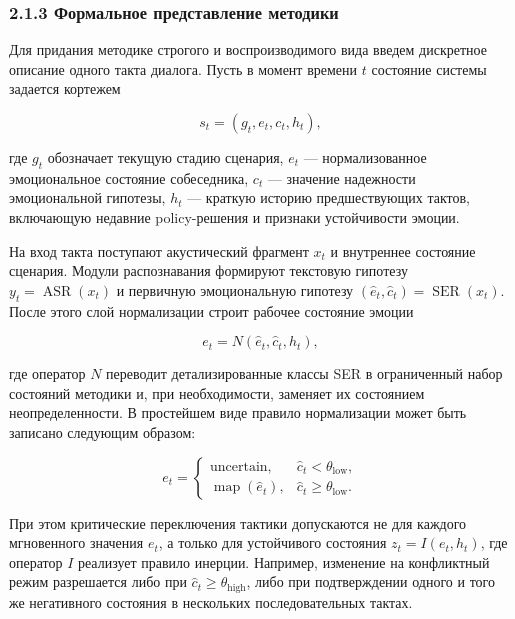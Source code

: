 \documentclass[a4paper,14pt]{extarticle}
\begin{document}
\subsubsection{2.1.3 Формальное представление
методики}\label{ux444ux43eux440ux43cux430ux43bux44cux43dux43eux435-ux43fux440ux435ux434ux441ux442ux430ux432ux43bux435ux43dux438ux435-ux43cux435ux442ux43eux434ux438ux43aux438}

Для придания методике строгого и воспроизводимого вида введем дискретное
описание одного такта диалога. Пусть в момент времени \(t\) состояние
системы задается кортежем

\begin{equation}
s_t = (g_t, e_t, c_t, h_t),
\end{equation}

где \(g_t\) обозначает текущую стадию сценария, \(e_t\) ---
нормализованное эмоциональное состояние собеседника, \(c_t\) ---
значение надежности эмоциональной гипотезы, \(h_t\) --- краткую историю
предшествующих тактов, включающую недавние policy-решения и признаки
устойчивости эмоции.

На вход такта поступают акустический фрагмент \(x_t\) и внутреннее
состояние сценария. Модули распознавания формируют текстовую гипотезу
\(y_t = \operatorname{ASR}(x_t)\) и первичную эмоциональную гипотезу
\((\hat e_t, \hat c_t) = \operatorname{SER}(x_t)\). После этого слой
нормализации строит рабочее состояние эмоции

\begin{equation}
e_t = N(\hat e_t, \hat c_t, h_t),
\end{equation}

где оператор \(N\) переводит детализированные классы SER в ограниченный
набор состояний методики и, при необходимости, заменяет их состоянием
неопределенности. В простейшем виде правило нормализации может быть
записано следующим образом:

\begin{equation}
e_t =
\begin{cases}
\mathrm{uncertain}, & \hat c_t < \theta_{\mathrm{low}},\\
\operatorname{map}(\hat e_t), & \hat c_t \ge \theta_{\mathrm{low}}.
\end{cases}
\end{equation}

При этом критические переключения тактики допускаются не для каждого
мгновенного значения \(e_t\), а только для устойчивого состояния
\(z_t = I(e_t, h_t)\), где оператор \(I\) реализует правило инерции.
Например, изменение на конфликтный режим разрешается либо при
\(\hat c_t \ge \theta_{\mathrm{high}}\), либо при подтверждении одного и
того же негативного состояния в нескольких последовательных тактах.
\end{document}
